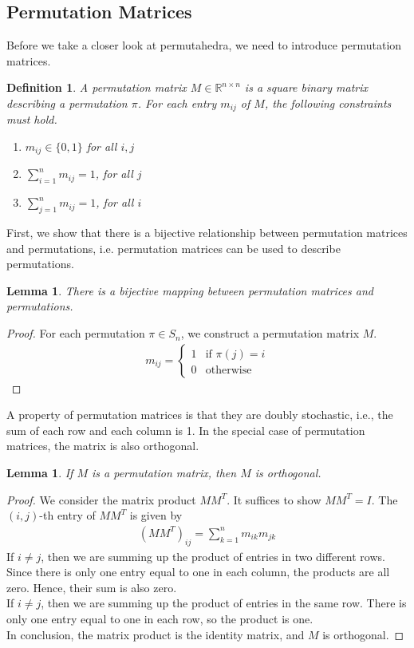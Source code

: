 \documentclass[12pt,letterpaper]{article}
\newcommand*{\R}{\mathbb{R}}
\newtheorem{definition}[theorem]{Definition}
\newtheorem{lemma}[theorem]{Lemma}
\begin{document}
\subsection{Permutation Matrices}
Before we take a closer look at permutahedra, we need to introduce permutation matrices.
\begin{definition}
    A permutation matrix $M \in \R^{n \times n}$ is a square binary matrix describing a permutation $\pi$.
    For each entry $m_{ij}$ of $M$, the following constraints must hold.
    \begin{enumerate}
        \item $m_{ij} \in \{0, 1\}$ for all $i, j$
        \item $\sum_{i = 1}^n m_{ij} = 1$, for all $j$
        \item $\sum_{j = 1}^n m_{ij} = 1$, for all $i$
    \end{enumerate}
\end{definition}
First, we show that there is a bijective relationship between permutation matrices and permutations, i.e. permutation matrices 
can be used to describe permutations.
\begin{lemma}
    There is a bijective mapping between permutation matrices and permutations.
\end{lemma}
\begin{proof}
    For each permutation $\pi \in S_n$, we construct a permutation matrix $M$.
    \begin{align*}
        m_{ij} = 
        \begin{cases}
            1 & \text{if } \pi(j) = i \\
            0 & \text{otherwise}
        \end{cases}
    \end{align*}
\end{proof}
A property of permutation matrices is that they are doubly stochastic, i.e., the sum of each row and each column is 1.
In the special case of permutation matrices, the matrix is also orthogonal.
\begin{lemma}
    If $M$ is a permutation matrix, then $M$ is orthogonal.
\end{lemma}
\begin{proof}
    We consider the matrix product $MM^T$. It suffices to show $MM^T = I$. The $(i, j)$-th entry of $MM^T$ is given by 
    \begin{align*}
        (MM^T)_{ij} = \sum_{k = 1}^n m_{ik}m_{jk}
    \end{align*}
    If $i \neq j$, then we are summing up the product of entries in two different rows. 
    Since there is only one entry equal to one in each column, the products are all zero. Hence, their sum is also zero. \\ 
    If $i \neq j$, then we are summing up the product of entries in the same row.
    There is only one entry equal to one in each row, so the product is one. \\
    In conclusion, the matrix product is the identity matrix, and $M$ is orthogonal.
\end{proof}
\end{document}
